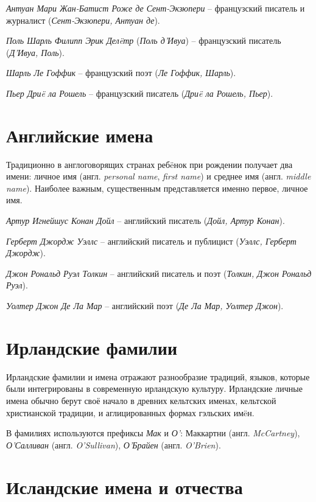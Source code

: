 \emph{Антуан Мари Жан-Батист Роже де Сент-Экзюпери} -- французский писатель и журналист (\emph{Сент-Экзюпери, Антуан де}).

\emph{Поль Шарль Филипп Эрик Дел\"eтр} (\emph{Поль д’Ивуа}) – французский писатель (\emph{Д’Ивуа, Поль}).

\emph{Шарль Ле Гоффик} -- французский поэт (\emph{Ле Гоффик, Шарль}).

\emph{Пьер Дри\"e ла Рошель} -- французский писатель (\emph{Дри\"e ла Рошель, Пьер}).

\section{Английские имена}

Традиционно в англоговорящих странах реб\"eнок при рождении получает два имени: личное имя (англ. \emph{personal name}, \emph{first name}) и среднее имя (англ. \emph{middle name}). Наиболее важным, существенным представляется именно первое, личное имя.

\emph{Артур Игнейшус Конан Дойл} -- английский писатель (\emph{Дойл, Артур Конан}).

\emph{Герберт Джордж Уэллс} -- английский писатель и публицист (\emph{Уэллс, Герберт Джордж}).

\emph{Джон Рональд Руэл Толкин} -- английский писатель и поэт (\emph{Толкин, Джон Рональд Руэл}).

\emph{Уолтер Джон Де Ла Мар} -- английский поэт (\emph{Де Ла Мар, Уолтер Джон}).

\section{Ирландские фамилии}

Ирландские фамилии и имена отражают разнообразие традиций, языков, которые были интегрированы в современную ирландскую культуру. Ирландские личные имена обычно берут своё начало в древних кельтских именах, кельтской христианской традиции, и аглицированных формах гэльских им\"eн.

В фамилиях используются префиксы \emph{Мак} и \emph{О'}: Маккартни (англ. \emph{McCartney}), \emph{О'Салливан} (англ. \emph{O'Sullivan}), \emph{О'Брайен} (англ. \emph{O'Brien}).

\section{Исландские имена и отчества}

